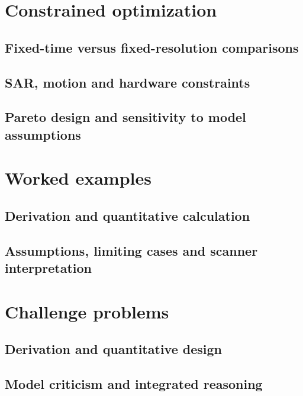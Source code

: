 \section{Constrained optimization}
\label{sec:24:constrained-optimization}
\subsection{Fixed-time versus fixed-resolution comparisons}
\subsection{SAR, motion and hardware constraints}
\subsection{Pareto design and sensitivity to model assumptions}

\section{Worked examples}
\label{sec:24:worked-examples}
\subsection{Derivation and quantitative calculation}
\subsection{Assumptions, limiting cases and scanner interpretation}

\section{Challenge problems}
\label{sec:24:challenge-problems}
\subsection{Derivation and quantitative design}
\subsection{Model criticism and integrated reasoning}
